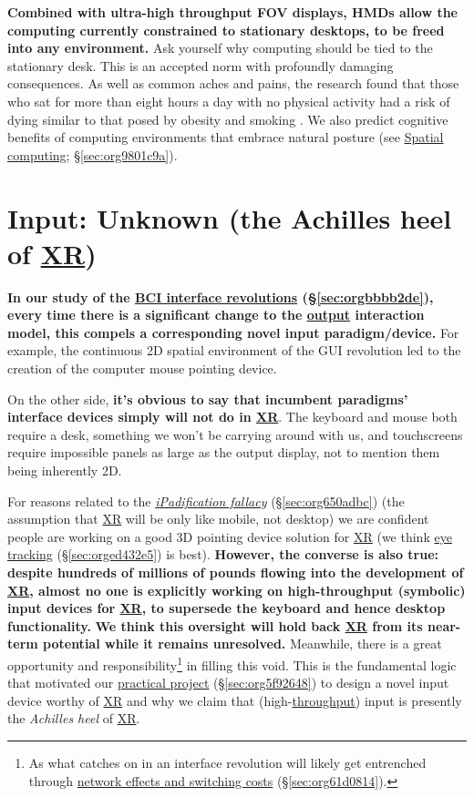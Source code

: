 \documentclass[logo,bsc,singlespacing,parskip]{infthesis}
\begin{document}
\textbf{Combined with ultra-high throughput FOV displays, HMDs allow the computing currently constrained to stationary desktops, to be freed into any environment.}
Ask yourself why computing should be tied to the stationary desk.
This is an accepted norm with profoundly damaging consequences.
As well as common aches and pains, the research found that those who sat for more than eight hours a day with no physical activity had a risk of dying similar to that posed by obesity and smoking \autocite{laskowskiSittingRisksHow}.
We also predict cognitive benefits of computing environments that embrace natural posture (see \hyperref[sec:org9801c9a]{Spatial computing}; \S \ref{sec:org9801c9a}).

\section{Input: Unknown (the Achilles heel of \hyperref[org39cbd51]{XR})}
\label{sec:org93500e2}
\textbf{In our study of the \hyperref[sec:orgbbbb2de]{BCI interface revolutions} (\S \ref{sec:orgbbbb2de}), every time there is a significant change to the \hyperref[output]{output} interaction model, this compels a corresponding novel input paradigm/device.}
For example, the continuous 2D spatial environment of the GUI revolution led to the creation of the computer mouse pointing device.

On the other side, \textbf{it's obvious to say that incumbent paradigms' interface devices simply will not do in \hyperref[org39cbd51]{XR}}.
The keyboard and mouse both require a desk, something we won't be carrying around with us, and touchscreens require impossible panels as large as the output display, not to mention them being inherently 2D.

For reasons related to the \emph{\hyperref[ipadification fallacy]{iPadification fallacy}} (\S \ref{sec:org650adbc}) (the assumption that \hyperref[org39cbd51]{XR} will be only like mobile, not desktop) we are confident people are working on a good 3D pointing device solution for \hyperref[org39cbd51]{XR} (we think \hyperref[sec:orged432e5]{eye tracking} (\S \ref{sec:orged432e5}) is best).
\textbf{However, the converse is also true: despite hundreds of millions of pounds flowing into the development of \hyperref[org39cbd51]{XR}, almost no one is explicitly working on high-throughput (symbolic) input devices for \hyperref[org39cbd51]{XR}, to supersede the keyboard and hence desktop functionality.}
\textbf{We think this oversight will hold back \hyperref[org39cbd51]{XR} from its near-term potential while it remains unresolved.}
Meanwhile, there is a great opportunity and responsibility\footnote{As what catches on in an interface revolution will likely get entrenched through \hyperref[sec:org61d0814]{network effects and switching costs} (\S \ref{sec:org61d0814}).} in filling this void.
This is the fundamental logic that motivated our \hyperref[sec:org5f92648]{practical project} (\S \ref{sec:org5f92648}) to design a novel input device worthy of \hyperref[org39cbd51]{XR} and why we claim that (high-\hyperref[throughput]{throughput}) input is presently the \emph{Achilles heel} of \hyperref[org39cbd51]{XR}.
\end{document}

